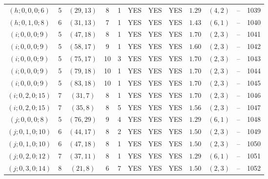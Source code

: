 \begin{longtable}{|c|c|c|c|c|c|c|c|c|c|c|c|}
$(h;0,0,0;6)$ & 5 & $(29,13)$ & 8 & 1 & YES & YES & YES & $1.29$ & $(4,2)$ & -- & 1039\\
$(h;0,1,0;8)$ & 6 & $(31,13)$ & 7 & 1 & YES & YES & YES & $1.43$ & $(6,1)$ & -- & 1040\\
$(i;0,0,0;9)$ & 5 & $(47,18)$ & 8 & 1 & YES & YES & YES & $1.70$ & $(2,3)$ & -- & 1041\\
$(i;0,0,0;9)$ & 5 & $(58,17)$ & 9 & 1 & YES & YES & YES & $1.60$ & $(2,3)$ & -- & 1042\\
$(i;0,0,0;9)$ & 5 & $(75,17)$ & 10 & 3 & YES & YES & YES & $1.70$ & $(2,3)$ & -- & 1043\\
$(i;0,0,0;9)$ & 5 & $(79,18)$ & 10 & 1 & YES & YES & YES & $1.70$ & $(2,3)$ & -- & 1044\\
$(i;0,0,0;9)$ & 5 & $(83,18)$ & 10 & 1 & YES & YES & YES & $1.70$ & $(2,3)$ & -- & 1045\\
$(i;0,2,0;15)$ & 7 & $(31,7)$ & 8 & 1 & YES & YES & YES & $1.70$ & $(2,3)$ & -- & 1046\\
$(i;0,2,0;15)$ & 7 & $(35,8)$ & 8 & 5 & YES & YES & YES & $1.56$ & $(2,3)$ & -- & 1047\\
$(j;0,0,0;8)$ & 5 & $(76,29)$ & 9 & 4 & YES & YES & YES & $1.29$ & $(6,1)$ & -- & 1048\\
$(j;0,1,0;10)$ & 6 & $(44,17)$ & 8 & 2 & YES & YES & YES & $1.50$ & $(2,3)$ & -- & 1049\\
$(j;0,1,0;10)$ & 6 & $(47,18)$ & 8 & 1 & YES & YES & YES & $1.50$ & $(2,3)$ & -- & 1050\\
$(j;0,2,0;12)$ & 7 & $(37,11)$ & 8 & 1 & YES & YES & YES & $1.29$ & $(6,1)$ & -- & 1051\\
$(j;0,3,0;14)$ & 8 & $(21,8)$ & 6 & 7 & YES & YES & YES & $1.50$ & $(2,3)$ & -- & 1052
\end{longtable}
